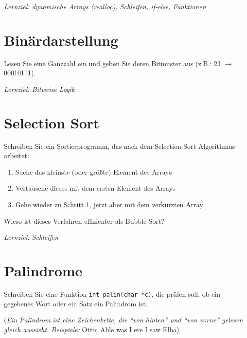 \documentclass[
	ngerman,
	fontsize=10pt,
	parskip=half,
	titlepage=true,
	DIV=12
]{scrartcl}
\begin{document}
\emph{Lernziel: dynamische Arrays (realloc), Schleifen, if-else, Funktionen}

\section{Binärdarstellung}
Lesen Sie eine Ganzzahl ein und geben Sie deren Bitmuster aus (z.B.: 23 $\rightarrow$ 00010111).

\emph{Lernziel: Bitweise Logik}

\section{Selection Sort}
Schreiben Sie ein Sortierprogramm, das nach dem Selection-Sort Algorithmus arbeitet: 
\begin{enumerate}
\item Suche das kleinste (oder größte) Element des Arrays
\item Vertausche dieses mit dem ersten Element des Arrays
\item Gehe wieder zu Schritt 1, jetzt aber mit dem verkürzten Array
\end{enumerate}
Wieso ist dieses Verfahren effizienter als Bubble-Sort?

\emph{Lernziel: Schleifen}

\section{Palindrome}
Schreiben Sie eine Funktion \texttt{int palin(char *c)}, die prüfen soll, ob ein gegebenes Wort oder ein Satz ein Palindrom ist. 

(\emph{Ein Palindrom ist eine Zeichenkette, die \enquote{von hinten} und \enquote{von vorne} gelesen gleich aussieht. Beispiele:} Otto; Able was I ere I saw Elba)
\end{document}
